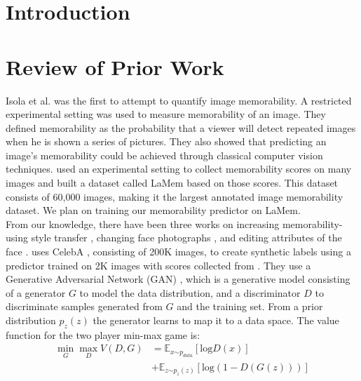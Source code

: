 \documentclass[10pt,twocolumn,letterpaper]{article}
\begin{document}
\section{Introduction}



\section{Review of Prior Work}
Isola et al. \cite{memo} was the first to attempt to quantify image memorability. A restricted experimental setting was used to measure memorability of an image. They defined memorability as the probability that a viewer will detect repeated images when he is shown a series of pictures. They also showed that predicting an image's memorability could be achieved through classical computer vision techniques. \cite{lamem} used an experimental setting to collect memorability scores on many images and built a dataset called LaMem based on those scores. This dataset consists of 60,000 images, making it the largest annotated image memorability dataset. We plan on training our memorability predictor on LaMem. \\



From our knowledge, there have been three works on increasing memorability- using style transfer \cite{style}, changing face photographs \cite{photo}, and editing attributes of the face \cite{face}.
\cite{face} uses CelebA \cite{celeb}, consisting of 200K images, to create synthetic labels using a predictor trained on 2K images with scores collected from \cite{iso}.
They use a Generative Adversarial Network (GAN) \cite{gene}, which is a generative model consisting of a generator $G$ to model the data distribution, and a discriminator $D$ to discriminate samples generated from $G$ and the training set. From a prior distribution $p_z(z)$ the generator learns to map it to a data space.
The value function for the two player min-max game is:
\begin{align*}
    \min_{G}\max_{D}V(D,G) &= \mathbb{E}_{x \stackrel{}{\sim} p_{data}}[\text{log} D(x)] \\
    &+ \mathbb{E}_{z \stackrel{}{\sim} p_z(z)} [\text{log}(1 - D(G(z)))]
\end{align*}
\end{document}
